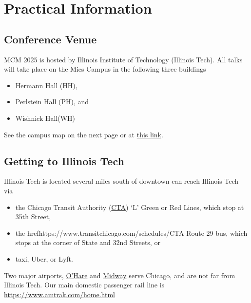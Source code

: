 


\chapter{Practical Information}



\section{Conference Venue}
MCM 2025 is hosted by Illinois Institute of Technology (Illinois Tech).  All talks will take place on the Mies Campus in the following three buildings
\begin{itemize}
	\item Hermann Hall (HH),
	\item Perlstein Hall (PH), and
	\item Wishnick Hall(WH)
\end{itemize}
See the campus map on the next page or at \href{https://www.iit.edu/sites/default/files/2022-08/mies-campus-accessibility-map-2022.pdf}{this link}.  


\section{Getting to Illinois Tech}
Illinois Tech is located several miles south of downtown  can reach Illinois Tech via 
\begin{itemize}
	\item the Chicago Transit Authority (\href{https://www.transitchicago.com/schedules/}{CTA}) `L' Green or Red Lines, which stop at 35th Street, 
	\item the href{https://www.transitchicago.com/schedules/}{CTA} Route 29 bus, which stops at the corner of State and 32nd Streets, or
	\item taxi, Uber, or Lyft.
\end{itemize}

Two major airports, \href{https://www.flychicago.com/ohare/home/Pages/default.aspx}{O'Hare} and \href{https://www.flychicago.com/midway/pages/default.aspx}{Midway} serve Chicago, and are not far from Illinois Tech.  Our main domestic passenger rail line is \href{Amtrak}{https://www.amtrak.com/home.html}

